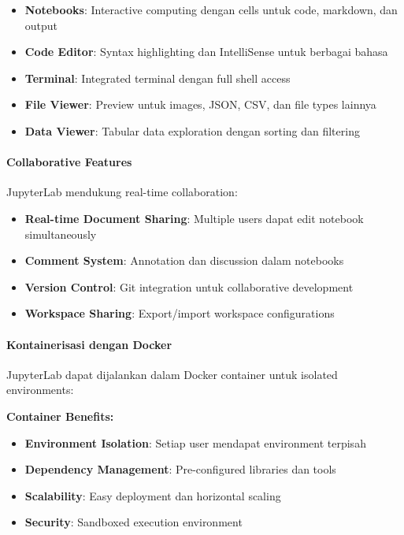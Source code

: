 \begin{itemize}
\item \textbf{Notebooks}: Interactive computing dengan cells untuk code, markdown, dan output
\item \textbf{Code Editor}: Syntax highlighting dan IntelliSense untuk berbagai bahasa
\item \textbf{Terminal}: Integrated terminal dengan full shell access
\item \textbf{File Viewer}: Preview untuk images, JSON, CSV, dan file types lainnya
\item \textbf{Data Viewer}: Tabular data exploration dengan sorting dan filtering
\end{itemize}

\paragraph{Collaborative Features}

JupyterLab mendukung real-time collaboration:
\begin{itemize}
\item \textbf{Real-time Document Sharing}: Multiple users dapat edit notebook simultaneously
\item \textbf{Comment System}: Annotation dan discussion dalam notebooks
\item \textbf{Version Control}: Git integration untuk collaborative development
\item \textbf{Workspace Sharing}: Export/import workspace configurations
\end{itemize}

\paragraph{Kontainerisasi dengan Docker}

JupyterLab dapat dijalankan dalam Docker container untuk isolated environments:

\textbf{Container Benefits:}
\begin{itemize}
\item \textbf{Environment Isolation}: Setiap user mendapat environment terpisah
\item \textbf{Dependency Management}: Pre-configured libraries dan tools
\item \textbf{Scalability}: Easy deployment dan horizontal scaling
\item \textbf{Security}: Sandboxed execution environment
\end{itemize}


